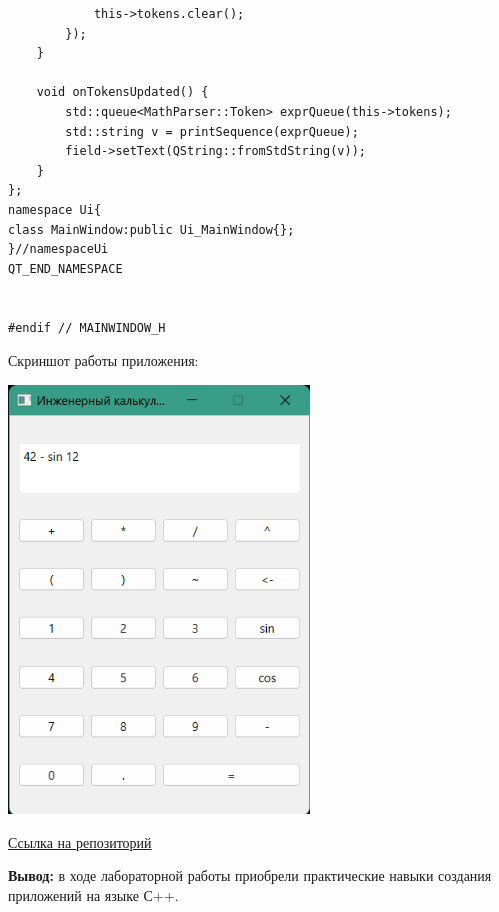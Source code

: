 \documentclass[a4paper,14pt]{extarticle}
\begin{document}
\begin{verbatim}
            this->tokens.clear();
        });
    }

    void onTokensUpdated() {
        std::queue<MathParser::Token> exprQueue(this->tokens);
        std::string v = printSequence(exprQueue);
        field->setText(QString::fromStdString(v));
    }
};
namespace Ui{
class MainWindow:public Ui_MainWindow{};
}//namespaceUi
QT_END_NAMESPACE


#endif // MAINWINDOW_H
\end{verbatim}

Скриншот работы приложения:
\begin{center}
    \includegraphics[width=80mm]{screenshot}
\end{center}

\href{https://gitlab.com/vlad4052/2024_pv223_vladislav_10}{Ссылка на репозиторий}

\textbf{Вывод: } в ходе лабораторной работы приобрели практические навыки создания приложений на
языке С++.
\end{document}
